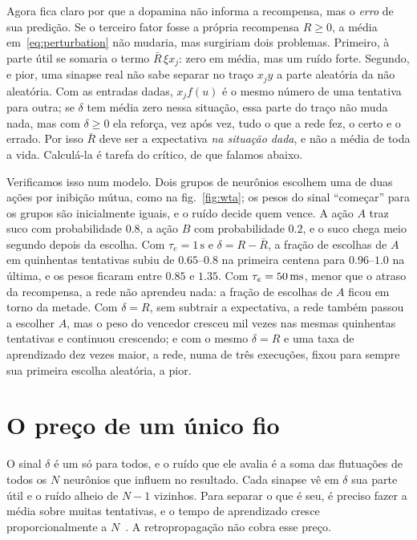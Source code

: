 Agora fica claro por que a dopamina não informa a recompensa, mas o \emph{erro} de sua predição. Se o terceiro fator fosse a própria recompensa $R\ge0$, a média em~\eqref{eq:perturbation} não mudaria, mas surgiriam dois problemas. Primeiro, à parte útil se somaria o termo $\bar R\,\xi x_j$: zero em média, mas um ruído forte. Segundo, e pior, uma sinapse real não sabe separar no traço $x_jy$ a parte aleatória da não aleatória. Com as entradas dadas, $x_jf(u)$ é o mesmo número de uma tentativa para outra; se $\delta$ tem média zero nessa situação, essa parte do traço não muda nada, mas com $\delta\ge0$ ela reforça, vez após vez, tudo o que a rede fez, o certo e o errado. Por isso $\bar R$ deve ser a expectativa \emph{na situação dada}, e não a média de toda a vida. Calculá-la é tarefa do crítico, de que falamos abaixo.

Verificamos isso num modelo. Dois grupos de neurônios  escolhem uma de duas ações por inibição mútua, como na fig.~\ref{fig:wta}; os pesos do sinal ``começar'' para os grupos são inicialmente iguais, e o ruído decide quem vence. A ação $A$ traz suco com probabilidade $0.8$, a ação $B$ com probabilidade $0.2$, e o suco chega meio segundo depois da escolha. Com $\tau_e=1\,\text{s}$ e $\delta=R-\bar R$, a fração de escolhas de $A$ em quinhentas tentativas subiu de $0.65$--$0.8$ na primeira centena para $0.96$--$1.0$ na última, e os pesos ficaram entre $0.85$ e $1.35$. Com $\tau_e=50\,\text{ms}$, menor que o atraso da recompensa, a rede não aprendeu nada: a fração de escolhas de $A$ ficou em torno da metade. Com $\delta=R$, sem subtrair a expectativa, a rede também passou a escolher $A$, mas o peso do vencedor cresceu mil vezes nas mesmas quinhentas tentativas e continuou crescendo; e com o mesmo $\delta=R$ e uma taxa de aprendizado dez vezes maior, a rede, numa de três execuções, fixou para sempre sua primeira escolha aleatória, a pior.

\section{O preço de um único fio}

O sinal $\delta$ é um só para todos, e o ruído que ele avalia é a soma das flutuações de todos os $N$ neurônios que influem no resultado. Cada sinapse vê em $\delta$ sua parte útil e o ruído alheio de $N-1$ vizinhos. Para separar o que é seu, é preciso fazer a média sobre muitas tentativas, e o tempo de aprendizado cresce proporcionalmente a $N$~\cite{Werfel2005}. A retropropagação não cobra esse preço.

